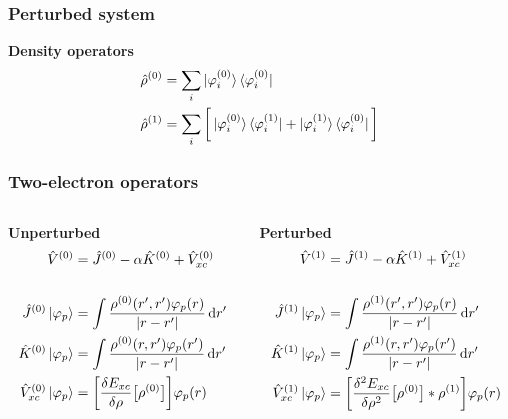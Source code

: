 \begin{frame}
    \frametitle{Perturbed system}
    \centering
    \textbf{Density operators}
    \begin{align}
        \nonumber
        \hat{\rho}^{(0)} &= \sum_i
        \ket{\varphi_i^{(0)}}\bra{\varphi_i^{(0)}}\\
        \nonumber
        \hat{\rho}^{(1)} &= \sum_i \bigg[
        \ket{\varphi_i^{(0)}}\bra{\varphi_i^{(1)}} +
        \ket{\varphi_i^{(1)}}\bra{\varphi_i^{(0)}} \bigg]
    \end{align}
\end{frame}

\begin{frame}
    \frametitle{Two-electron operators}
    \begin{columns}
    \begin{column}[b]{0.4\linewidth}
    \centering
    \textbf{Unperturbed}
    \begin{align}
        \nonumber
        \hat{V}^{(0)} &= \hat{J}^{(0)} -\alpha\hat{K}^{(0)} + \hat{V}_{xc}^{(0)}\\
        \nonumber & \\
        \nonumber
        \hat{J}^{(0)} \ket{\varphi_p} &= \int\frac{\rho^{(0)}(r',r')\varphi_p(r)}{|r-r'|} \,\mathrm{d} r'\\
        \nonumber
        \hat{K}^{(0)} \ket{\varphi_p} &= \int\frac{\rho^{(0)}(r,r')\varphi_p(r')}{|r-r'|} \,\mathrm{d} r'\\
        \nonumber
        \hat{V}_{xc}^{(0)} \ket{\varphi_p} &= \bigg[\frac{\delta E_{xc}}{\delta\rho}\big[\rho^{(0)}\big]\bigg] \varphi_p(r) 
    \end{align}
    \end{column}
    \begin{column}[b]{0.6\linewidth}
    \centering
    \textbf{Perturbed}
    \begin{align}
        \nonumber
        \hat{V}^{(1)} &= \hat{J}^{(1)} -\alpha\hat{K}^{(1)} + \hat{V}_{xc}^{(1)}\\
        \nonumber & \\
        \nonumber
        \hat{J}^{(1)} \ket{\varphi_p} &= \int\frac{\rho^{(1)}(r',r')\varphi_p(r)}{|r-r'|} \,\mathrm{d} r'\\
        \nonumber
        \hat{K}^{(1)} \ket{\varphi_p} &= \int\frac{\rho^{(1)}(r,r')\varphi_p(r')}{|r-r'|} \,\mathrm{d} r'\\
        \nonumber
        \hat{V}_{xc}^{(1)} \ket{\varphi_p} &= \bigg[\frac{\delta^2 E_{xc}}{\delta
        \rho^2}\big[\rho^{(0)}\big]*\rho^{(1)}\bigg] \varphi_p(r) 
    \end{align}
    \end{column}
    \end{columns}


\end{frame}
